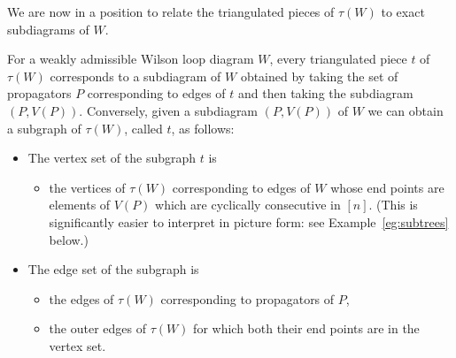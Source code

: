 \documentclass[11pt]{article}
\theoremstyle{remark}
\theoremstyle{definition}
\begin{document}
We are now in a position to relate the triangulated pieces of $\tau(W)$ to exact subdiagrams of $W$.

For a weakly admissible Wilson loop diagram $W$, every triangulated piece $t$ of $\tau(W)$ corresponds to a subdiagram of $W$ obtained by taking the set of propagators $P$ corresponding to edges of $t$ and then taking the subdiagram $(P, V(P))$.  Conversely, given a subdiagram $(P, V(P))$ of $W$ we can obtain a subgraph of $\tau(W)$, called $t$, as follows:
\begin{itemize}
\item The vertex set of the subgraph $t$ is
  \begin{itemize}
  \item the vertices of $\tau(W)$ corresponding to edges of $W$ whose end points are elements of $V(P)$ which are cyclically consecutive in $[n]$. (This is significantly easier to interpret in picture form: see Example~\ref{eg:subtrees} below.)
  \end{itemize}
\item The edge set of the subgraph is
  \begin{itemize}
  \item the edges of $\tau(W)$ corresponding to propagators of $P$,
  \item the outer edges of $\tau(W)$ for which both their end points are in the vertex set.
  \end{itemize}
\end{itemize}
\end{document}
